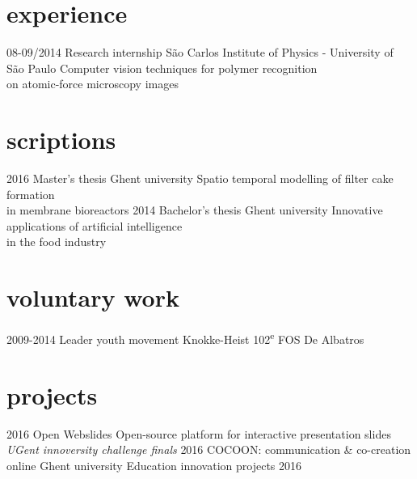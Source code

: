 \documentclass[]{friggeri-cv}
\begin{document}
\section{experience}
\begin{entrylist}
  \entry
    {08-09/2014}
    {Research internship}
    {S\~{a}o Carlos Institute of Physics - University of S\~{a}o Paulo}
    {Computer vision techniques for polymer recognition\\ on atomic-force microscopy images}
\end{entrylist}

\section{scriptions}
\begin{entrylist}
  \entry
    {2016}
    {Master's thesis}
    {Ghent university}
    {Spatio temporal modelling of filter cake formation\\ in membrane bioreactors}
  \entry
    {2014}
    {Bachelor's thesis}
    {Ghent university}
    {Innovative applications of artificial intelligence\\ in the food industry}
\end{entrylist}

\section{voluntary work}
\begin{entrylist}
 \entry
    {2009-2014}
    {Leader youth movement}
    {Knokke-Heist}
    {102\textsuperscript{e} FOS De Albatros}
\end{entrylist} 
\section{projects}
\begin{entrylist}
 \entry
 {2016}
 {Open Webslides}
 {}
 {Open-source platform for interactive presentation slides \\ \emph{UGent innoversity challenge finals}}
 \entry
 {2016}
 {COCOON: communication \& co-creation online}
 {Ghent university}
 {Education innovation projects 2016}
  
\end{entrylist} 
\end{document}
